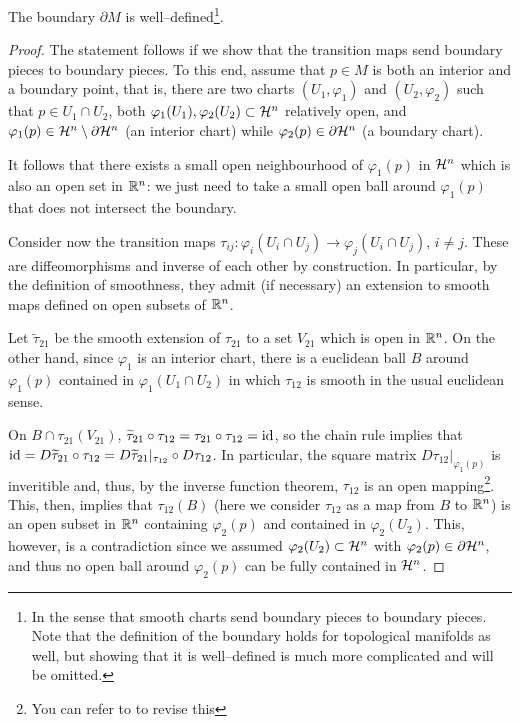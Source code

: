 \begin{proposition}\label{prop:bdwelldef}
  The boundary $\partial M$ is well--defined\footnote{In the sense that smooth charts send boundary pieces to boundary pieces. Note that the definition of the boundary holds for topological manifolds as well, but showing that it is well--defined is much more complicated and will be omitted.}.
\end{proposition}
\begin{proof}
  The statement follows if we show that the transition maps send boundary pieces to boundary pieces.
  To this end, assume that $p\in M$ is both an interior and a boundary point, that is, there are two charts $(U_1, \varphi_1)$ and $(U_2,\varphi_2)$ such that $p \in U_1\cap U_2$, both $\varphi_1(U_1), \varphi_2(U_2) \subset\mathcal{H}^n$ relatively open, and $\varphi_1(p) \in \mathcal{H}^n\setminus\partial\mathcal{H}^n$ (an interior chart) while $\varphi_2(p) \in \partial\mathcal{H}^n$ (a boundary chart).

  It follows that there exists a small open neighbourhood of $\varphi_1(p)$ in $\mathcal{H}^n$ which is also an open set in $\mathbb{R}^n$: we just need to take a small open ball around $\varphi_1(p)$ that does not intersect the boundary.

  Consider now the transition maps $\tau_{ij} : \varphi_i(U_i\cap U_j) \to \varphi_j(U_i\cap U_j)$, $i\neq j$.
  These are diffeomorphisms and inverse of each other by construction.
  In particular, by the definition of smoothness, they admit (if necessary) an extension to smooth maps defined on open subsets of $\mathbb{R}^n$.

  Let $\widetilde\tau_{21}$ be the smooth extension of $\tau_{21}$ to a set $V_{21}$ which is open in $\mathbb{R}^n$.
  On the other hand, since $\varphi_1$ is an interior chart, there is a euclidean ball $B$ around $\varphi_1(p)$ contained in $\varphi_1(U_1\cap U_2)$ in which $\tau_{12}$ is smooth in the usual euclidean sense.

  On $B \cap \tau_{21}(V_{21})$, $\widetilde\tau_{21} \circ \tau_{12} = \tau_{21} \circ \tau_{12} = \operatorname{id}$, so the chain rule implies that $\operatorname{id} = D \widetilde\tau_{21} \circ \tau_{12} = D\widetilde\tau_{21}|_{\tau_{12}} \circ D\tau_{12}$.
  In particular, the square matrix $D\tau_{12}|_{\varphi_1(p)}$ is inveritible and, thus, by the inverse function theorem, $\tau_{12}$ is an open mapping\footnote{You can refer to \cite[Corollary C.36]{book:lee} to revise this}.
  This, then, implies that $\tau_{12}(B)$ (here we consider $\tau_{12}$ as a map from $B$ to $\mathbb{R}^n$) is an open subset in $\mathbb{R}^n$ containing $\varphi_2(p)$ and contained in $\varphi_2(U_2)$.
  This, however, is a contradiction since we assumed $\varphi_2(U_2)\subset\mathcal{H}^n$ with $\varphi_2(p) \in \partial\mathcal{H}^n$, and thus no open ball around $\varphi_2(p)$ can be fully contained in $\mathcal{H}^n$.
\end{proof}

